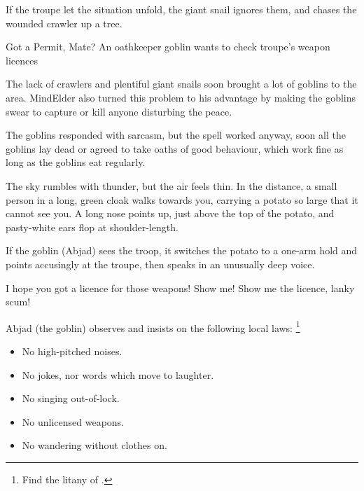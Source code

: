 \begin{multicols}{2}
\giantSnail

\chitincrawler

If the troupe let the situation unfold, the giant snail ignores them, and chases the wounded \gls{crawler} up a tree.

{Got a Permit, Mate?}%
{An oathkeeper goblin wants to check troupe's weapon licences}%


\begin{exampletext}
  The lack of \glspl{crawler} and plentiful giant snails soon brought a lot of goblins to the area.
  \Gls{MindElder} also turned this problem to his advantage by making the goblins swear to capture or kill anyone disturbing the peace.

  The goblins responded with sarcasm, but the spell worked anyway, soon all the goblins lay dead or agreed to take oaths of good behaviour, which work fine as long as the goblins eat regularly.
\end{exampletext}

\begin{boxtext}
  The sky rumbles with thunder, but the air feels thin.
  In the distance, a small person in a long, green cloak walks towards you, carrying a potato so large that it cannot see you.
  A long nose points up, just above the top of the potato, and pasty-white ears flop at shoulder-length.
\end{boxtext}

If the goblin (Abjad) sees the troop, it switches the potato to a one-arm hold and points accusingly at the troupe, then speaks in an unusually deep voice.

\null
\begin{speechtext}
  I hope you got a licence for those weapons!
  Show me!
  Show me the licence, lanky scum!
\end{speechtext}

Abjad (the goblin) observes and insists on the following local laws:%
\footnote{Find the litany of  .}
\label{ravencopsLaws}

\begin{itemize}
  \item
  No high-pitched noises.
  \item
  No jokes, nor words which move to laughter.
  \item
  No singing out-of-lock.
  \item
  No unlicensed weapons.
  \item
  No wandering without clothes on.
\end{itemize}


\end{multicols}
